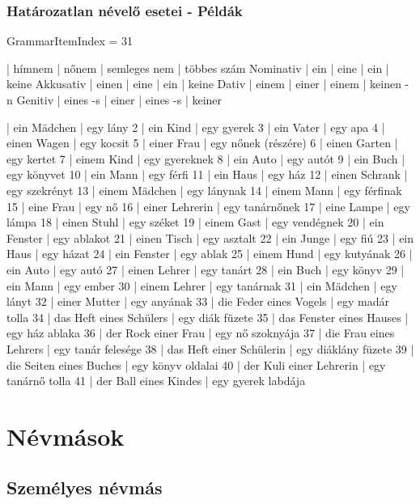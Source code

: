 \documentclass{article}
\newenvironment{desc}{\verbatim}{\endverbatim}
\newenvironment{exmp}{\verbatim}{\endverbatim}
\begin{document}
\subsubsection{Határozatlan névelő esetei - Példák}

GrammarItemIndex = 31

\begin{desc}
          | hímnem   | nőnem | semleges nem | többes szám
Nominativ | ein      | eine  | ein          | keine
Akkusativ | einen    | eine  | ein          | keine
Dativ     | einem    | einer | einem        | keinen -n
Genitiv   | eines -s | einer | eines -s     | keiner
\end{desc}

\begin{exmp}
1 | ein Mädchen | egy lány
2 | ein Kind | egy gyerek
3 | ein Vater | egy apa
4 | einen Wagen | egy kocsit
5 | einer Frau | egy nőnek (részére)
6 | einen Garten | egy kertet
7 | einem Kind | egy gyereknek
8 | ein Auto | egy autót
9 | ein Buch | egy könyvet
10 | ein Mann | egy férfi
11 | ein Haus | egy ház
12 | einen Schrank | egy szekrényt
13 | einem Mädchen | egy lánynak
14 | einem Mann | egy férfinak
15 | eine Frau | egy nő
16 | einer Lehrerin | egy tanárnőnek
17 | eine Lampe | egy lámpa
18 | einen Stuhl | egy széket
19 | einem Gast | egy vendégnek
20 | ein Fenster | egy ablakot
21 | einen Tisch | egy asztalt
22 | ein Junge | egy fiú
23 | ein Haus | egy házat
24 | ein Fenster | egy ablak
25 | einem Hund | egy kutyának
26 | ein Auto | egy autó
27 | einen Lehrer | egy tanárt
28 | ein Buch | egy könyv
29 | ein Mann | egy ember
30 | einem Lehrer | egy tanárnak
31 | ein Mädchen | egy lányt
32 | einer Mutter | egy anyának
33 | die Feder eines Vogels | egy madár tolla
34 | das Heft eines Schülers | egy diák füzete
35 | das Fenster eines Hauses | egy ház ablaka
36 | der Rock einer Frau | egy nő szoknyája
37 | die Frau eines Lehrers | egy tanár felesége
38 | das Heft einer Schülerin | egy diáklány füzete
39 | die Seiten eines Buches | egy könyv oldalai
40 | der Kuli einer Lehrerin | egy tanárnő tolla
41 | der Ball eines Kindes | egy gyerek labdája
\end{exmp}

\section{Névmások}

\subsection{Személyes névmás}
\end{document}
